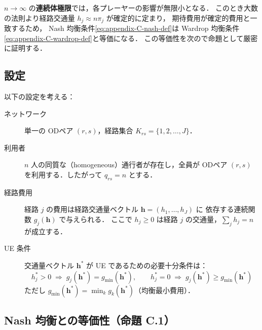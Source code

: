 $n \to \infty$ の\textbf{連続体極限}では，各プレーヤーの影響が無限小となる．
このとき大数の法則より経路交通量 $h_j \approx n\pi_j$ が確定的に定まり，
期待費用が確定的費用と一致するため，
Nash 均衡条件\eqref{eq:appendix-C-nash-def}は
Wardrop 均衡条件\eqref{eq:appendix-C-wardrop-def}と等価になる．
この等価性を次ので命題として厳密に証明する．

\subsection{設定}
\label{subsec:appendix-C-setup}

以下の設定を考える：

\begin{description}
  \item[ネットワーク] 単一の ODペア $(r, s)$，経路集合 $K_{rs} = \{1, 2, \ldots, J\}$．
  \item[利用者] $n$ 人の同質な（homogeneous）通行者が存在し，全員が ODペア $(r,s)$
                を利用する．したがって $q_{rs} = n$ とする．
  \item[経路費用] 経路 $j$ の費用は経路交通量ベクトル $\boldsymbol{h} = (h_1, \ldots, h_J)$ に
                  依存する連続関数 $g_j(\boldsymbol{h})$ で与えられる．
                  ここで $h_j \geq 0$ は経路 $j$ の交通量，$\sum_j h_j = n$ が成立する．
  \item[UE 条件] 交通量ベクトル $\boldsymbol{h}^*$ が UE であるための必要十分条件は：
        \begin{equation}
          h_j^* > 0 \;\Rightarrow\; g_j(\boldsymbol{h}^*) = g_{\min}(\boldsymbol{h}^*),
          \qquad
          h_j^* = 0 \;\Rightarrow\; g_j(\boldsymbol{h}^*) \geq g_{\min}(\boldsymbol{h}^*)
          \label{eq:appendix-C-ue}
        \end{equation}
        ただし $g_{\min}(\boldsymbol{h}^*) = \min_k g_k(\boldsymbol{h}^*)$（均衡最小費用）．
\end{description}

\subsection{Nash 均衡との等価性（命題 C.1）}
\label{subsec:appendix-C-proposition}

